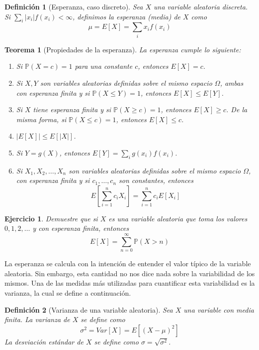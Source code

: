 \documentclass[11pt]{report}
\theoremstyle{break}
\newtheorem{definicion}{Definición}[chapter]
\newtheorem{teorema}{Teorema}[chapter]
\newtheorem{ejercicio}{Ejercicio}[chapter]
\theoremstyle{break}
\begin{document}
\begin{definicion}[Esperanza, caso discreto]
\label{definicion:esperanza caso discreto}
Sea $X$ una variable aleatoria discreta. Si $\sum_{i} |x_i|f(x_i) < \infty$, definimos la esperanza (media) de $X$ como
$$
\mu = E[X] = \sum_{i}x_if(x_i)
$$
\end{definicion}

\begin{teorema}[Propiedades de la esperanza]
\label{teorema:propiedades de la esperanza}
La esperanza cumple lo siguiente:
\begin{enumerate}[label=\alph*)]
\item Si $\mathbb{P}(X = c) = 1$ para una constante $c$, entonces $E[X] = c$.
\item Si $X,Y$ son variables aleatorias definidas sobre el mismo espacio $\Omega$, ambas con esperanza finita y si $\mathbb{P}(X \leq Y) = 1$, entonces $E[X] \leq E[Y]$.
\item Si $X$ tiene esperanza finita y si $\mathbb{P}(X \geq c) = 1$, entonces $E[X] \geq c$. De la misma forma, si $\mathbb{P}(X \leq c) = 1$, entonces $E[X] \leq c$.
\item $|E[X]| \leq E[|X|]$.
\item Si $Y = g(X)$, entonces $E[Y] = \sum_{i}g(x_i)f(x_i)$.
\item Si $X_1, X_2, \ldots, X_n$ son variables aleatorias definidas sobre el mismo espacio $\Omega$, con esperanza finita y si $c_1, \ldots, c_n$ son constantes, entonces
$$
E\left[ \sum_{i=1}^{n}c_{i}X_i \right] = \sum_{i=1}^{n}c_iE[X_i]
$$
\end{enumerate}
\end{teorema}

\begin{ejercicio}
Demuestre que si $X$ es una variable aleatoria que toma los valores $0,1,2,\ldots$ y con esperanza finita, entonces
$$
E[X] = \sum_{n=0}^{\infty} \mathbb{P}(X > n)
$$
\end{ejercicio}
La esperanza se calcula con la intención de entender el valor típico de la variable aleatoria. Sin embargo, esta cantidad no nos dice nada sobre la variabilidad de los mismos. Una de las medidas más utilizadas para cuantificar esta variabilidad es la varianza, la cual se define a continuación.

\begin{definicion}[Varianza de una variable aleatoria]
Sea $X$ una variable con media finita. La varianza de $X$ se define como
$$
\sigma^2 = Var[X] =  E[(X - \mu)^2]
$$
La desviación estándar de $X$ se define como $\sigma = \sqrt{\sigma^2}$.
\end{definicion}
\end{document}
